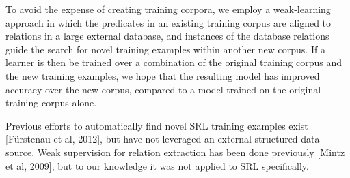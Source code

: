 To avoid the expense of creating training corpora, we employ a weak-learning approach in which the predicates in an existing training corpus are aligned to relations in a large external database, and instances of the database relations guide the search for novel training examples within another new corpus.  If a learner is then be trained over a combination of the original training corpus and the new training examples, we hope that the resulting model has improved accuracy over the new corpus, compared to a model trained on the original training corpus alone.

Previous efforts to automatically find novel SRL training examples exist [Fürstenau et al, 2012], but have not leveraged an external structured data source.  Weak supervision for relation extraction has been done previously [Mintz et al, 2009], but to our knowledge it was not applied to SRL specifically.
